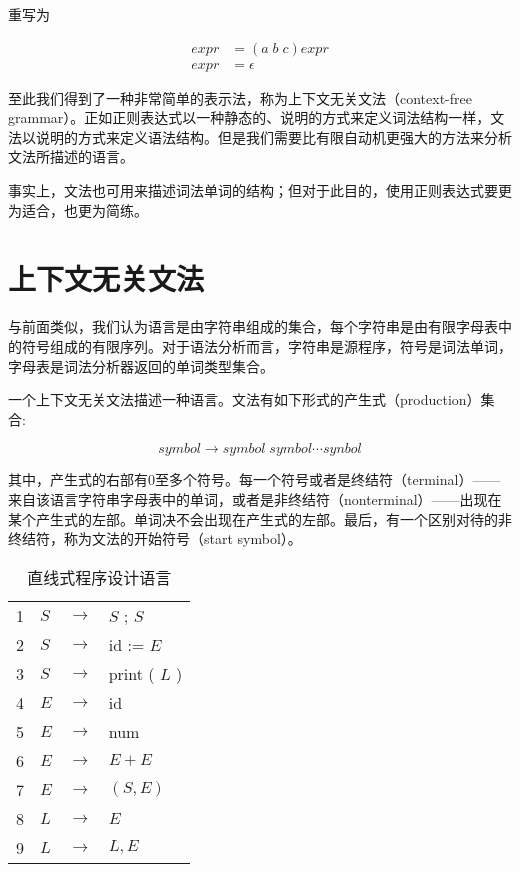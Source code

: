 \documentclass[cn,11pt,chinese]{elegantbook}
\begin{document}
重写为

\begin{align*}
expr &= (a \; b \; c)expr \\
expr &= \epsilon
\end{align*}

至此我们得到了一种非常简单的表示法，称为上下文无关文法（context-free grammar）。正如正则表达式以一种静态的、说明的方式来定义词法结构一样，文法以说明的方式来定义语法结构。但是我们需要比有限自动机更强大的方法来分析文法所描述的语言。

事实上，文法也可用来描述词法单词的结构；但对于此目的，使用正则表达式要更为适合，也更为简练。

\section{上下文无关文法}

与前面类似，我们认为语言是由字符串组成的集合，每个字符串是由有限字母表中的符号组成的有限序列。对于语法分析而言，字符串是源程序，符号是词法单词，字母表是词法分析器返回的单词类型集合。

一个上下文无关文法描述一种语言。文法有如下形式的产生式（production）集合: 

$$
symbol \rightarrow symbol \; symbol \cdots synbol
$$

其中，产生式的右部有0至多个符号。每一个符号或者是终结符（terminal）——来自该语言字符串字母表中的单词，或者是非终结符（nonterminal）——出现在某个产生式的左部。单词决不会出现在产生式的左部。最后，有一个区别对待的非终结符，称为文法的开始符号（start symbol）。

\renewcommand\tablename{文法}
\begin{table}[htbp]
  \centering
  \begin{tabular}{llll}
  \toprule
  1 & $S$ & $\rightarrow$ & $S$ ; $S$ \\
  2 & $S$ & $\rightarrow$ & id := $E$ \\
  3 & $S$ & $\rightarrow$ & print ( $L$ ) \\
  \midrule
  4 & $E$ & $\rightarrow$ & id \\
  5 & $E$ & $\rightarrow$ & num \\
  6 & $E$ & $\rightarrow$ & $E+E$ \\
  7 & $E$ & $\rightarrow$ & $(S,E)$ \\
  \midrule
  8 & $L$ & $\rightarrow$ & $E$ \\
  9 & $L$ & $\rightarrow$ & $L,E$ \\
  \bottomrule
  \end{tabular}
  \caption{直线式程序设计语言}\label{grammar:3-1}
\end{table}
\renewcommand\tablename{表}
\end{document}
